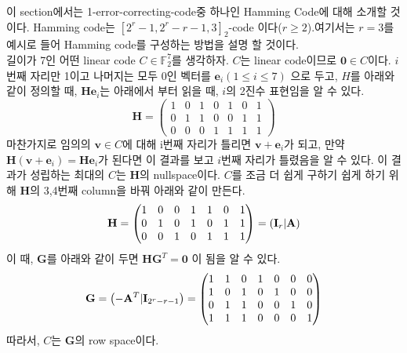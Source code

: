 \documentclass[11pt]{article}
\begin{document}
이 section에서는 1-error-correcting-code중 하나인 Hamming Code에 대해 소개할 것이다. Hamming code는 $[2^{r}-1,2^{r}-r-1,3]_{2}$-code 이다($r\geq2$).여기서는 $r=3$를 예시로 들어 Hamming code를 구성하는 방법을 설명 할 것이다.\\
길이가 7인 어떤 linear code $C \in \mathbb{F}_{2}^{7}$를 생각하자. $C$는 linear code이므로 $\mathbf{0} \in C$이다. $i$번째 자리만 1이고 나머지는 모두 0인 벡터를 $\mathbf{e}_{i}(1\leq i \leq 7)$  으로 두고, $H$를 아래와 같이 정의할 때, $\mathbf{H}\mathbf{e}_{i}$는 아래에서 부터 읽을 때, $i$의 2진수 표현임을 알 수 있다.
\begin{displaymath}
\mathbf{H} = \begin{pmatrix}1&0&1&0&1&0&1\\ 0&1&1&0&0&1&1\\0&0&0&1&1&1&1\end{pmatrix}
\end{displaymath}
마찬가지로 임의의 $\mathbf{v}\in C$에 대해 i번째 자리가 틀리면 $\mathbf{v}+\mathbf{e}_{i}$가 되고, 만약 $\mathbf{H}(\mathbf{v}+\mathbf{e}_{i})=\mathbf{H}\mathbf{e}_{i}$가 된다면 이 결과를 보고 $i$번째 자리가 틀렸음을 알 수 있다. 이 결과가 성립하는 최대의 $C$는 $\mathbf{H}$의 nullspace이다.  $C$를 조금 더 쉽게 구하기 쉽게 하기 위해 $\mathbf{H}$의 3,4번째 column을 바꿔 아래와 같이 만든다.
\begin{displaymath}
\mathbf{H} = \begin{pmatrix}1&0&0&1&1&0&1\\ 0&1&0&1&0&1&1\\0&0&1&0&1&1&1\end{pmatrix} = \left( \mathbf{I}_{r} \arrowvert  \mathbf{A}  \right)
\end{displaymath}
이 때, $\mathbf{G}$를 아래와 같이 두면 $\mathbf{H}\mathbf{G}^{T}=\mathbf{0}$ 이 됨을 알 수 있다.
\begin{displaymath}
\mathbf{G}= \left(  -\mathbf{A}^{T} \arrowvert  \mathbf{I}_{2^{r}-r-1}  \right) = \begin{pmatrix}1&1&0&1&0&0&0\\ 1&0&1&0&1&0&0\\0&1&1&0&0&1&0\\1&1&1&0&0&0&1\end{pmatrix}
\end{displaymath}
따라서,  $C$는  $\mathbf{G}$의 row space이다.
\end{document}
